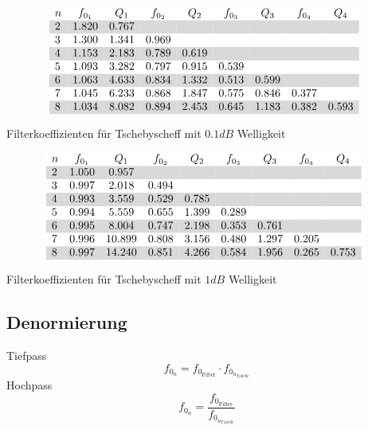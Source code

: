 \begin{table}[h!]
\[ \begin{array}{@{}lcccccccc}
\rowcolor{white} n & f_{0_1}& Q_1   & f_{0_2}   & Q_2   & f_{0_3}   & Q_3   & f_{0_4}   & Q_4   \\
\rowcolor{lgray} 2 & 1.820  & 0.767 &           &       &           &       &           &       \\
\rowcolor{white} 3 & 1.300  & 1.341 & 0.969     &       &           &       &           &       \\
\rowcolor{lgray} 4 & 1.153  & 2.183 & 0.789     & 0.619 &           &       &           &       \\
\rowcolor{white} 5 & 1.093  & 3.282 & 0.797     & 0.915 & 0.539     &       &           &       \\
\rowcolor{lgray} 6 & 1.063  & 4.633 & 0.834     & 1.332 & 0.513     & 0.599 &           &       \\
\rowcolor{white} 7 & 1.045  & 6.233 & 0.868     & 1.847 & 0.575     & 0.846 & 0.377     &       \\
\rowcolor{lgray} 8 & 1.034  & 8.082 & 0.894     & 2.453 & 0.645     & 1.183 & 0.382     & 0.593 \\
\end{array} \]
\caption{Filterkoeffizienten für Tschebyscheff mit $0.1 dB$ Welligkeit}
\label{tab:filt-coeff-tsche01}
\end{table}

\begin{table}[h!]
\[ \begin{array}{@{}lcccccccc}
\rowcolor{white} n & f_{0_1}& Q_1   & f_{0_2}   & Q_2   & f_{0_3}   & Q_3   & f_{0_4}   & Q_4   \\
\rowcolor{lgray} 2 & 1.050  & 0.957 &           &       &           &       &           &       \\
\rowcolor{white} 3 & 0.997  & 2.018 & 0.494     &       &           &       &           &       \\
\rowcolor{lgray} 4 & 0.993  & 3.559 & 0.529     & 0.785 &           &       &           &       \\
\rowcolor{white} 5 & 0.994  & 5.559 & 0.655     & 1.399 & 0.289     &       &           &       \\
\rowcolor{lgray} 6 & 0.995  & 8.004 & 0.747     & 2.198 & 0.353     & 0.761 &           &       \\
\rowcolor{white} 7 & 0.996  &10.899 & 0.808     & 3.156 & 0.480     & 1.297 & 0.205     &       \\
\rowcolor{lgray} 8 & 0.997  &14.240 & 0.851     & 4.266 & 0.584     & 1.956 & 0.265     & 0.753 \\
\end{array} \]
\caption{Filterkoeffizienten für Tschebyscheff mit $1 dB$ Welligkeit}
\label{tab:filt-coeff-tsche1}
\end{table}

\clearpage
\subsection{Denormierung}
Tiefpass
\[ f_{0_n} = f_{0_{\text{Filter}}} \cdot f_{0_{n_{\text{Tabelle}}}} \]
Hochpass
\[ f_{0_n} = \frac{f_{0_{\text{Filter}}}}{f_{0_{n_{\text{Tabelle}}}}} \]